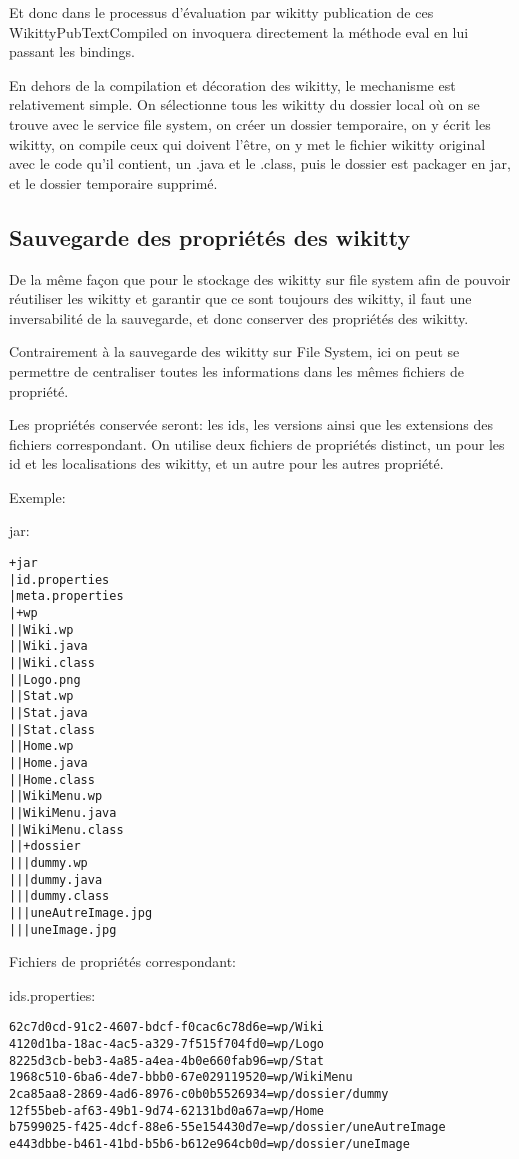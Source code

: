 Et donc dans le processus d'évaluation par wikitty publication de ces 
WikittyPubTextCompiled on invoquera directement la méthode eval en lui passant
les bindings.

En dehors de la compilation et décoration des wikitty, le mechanisme est 
relativement simple. On sélectionne tous les wikitty du dossier local où on
se trouve avec le service file system, on créer un dossier temporaire, 
on y écrit les wikitty, on compile ceux qui doivent l'être, on y met le fichier
wikitty original avec le code qu'il contient, un .java et le .class, puis le 
dossier est packager en jar, et le dossier temporaire supprimé.


\subsection{Sauvegarde des propriétés des wikitty}

De la même façon que pour le stockage des wikitty sur file system afin de 
pouvoir réutiliser les wikitty et garantir que ce sont toujours des wikitty,
il faut une inversabilité de la sauvegarde, et donc conserver des propriétés des
wikitty.

Contrairement à la sauvegarde des wikitty sur File System, ici on peut se 
permettre de centraliser toutes les informations dans les mêmes fichiers de 
propriété. 

Les propriétés conservée seront: les ids, les versions ainsi que les extensions
des fichiers correspondant. On utilise deux fichiers de propriétés distinct, 
un pour les id et les localisations des wikitty, et un autre pour les autres 
propriété.

Exemple: %

jar:
\begin{verbatim}
+jar
|id.properties
|meta.properties
|+wp
||Wiki.wp
||Wiki.java
||Wiki.class
||Logo.png
||Stat.wp
||Stat.java
||Stat.class
||Home.wp
||Home.java
||Home.class
||WikiMenu.wp
||WikiMenu.java
||WikiMenu.class
||+dossier
|||dummy.wp
|||dummy.java
|||dummy.class
|||uneAutreImage.jpg
|||uneImage.jpg
\end{verbatim}

Fichiers de propriétés correspondant:


ids.properties:
\begin{verbatim}
62c7d0cd-91c2-4607-bdcf-f0cac6c78d6e=wp/Wiki
4120d1ba-18ac-4ac5-a329-7f515f704fd0=wp/Logo
8225d3cb-beb3-4a85-a4ea-4b0e660fab96=wp/Stat
1968c510-6ba6-4de7-bbb0-67e029119520=wp/WikiMenu
2ca85aa8-2869-4ad6-8976-c0b0b5526934=wp/dossier/dummy
12f55beb-af63-49b1-9d74-62131bd0a67a=wp/Home
b7599025-f425-4dcf-88e6-55e154430d7e=wp/dossier/uneAutreImage
e443dbbe-b461-41bd-b5b6-b612e964cb0d=wp/dossier/uneImage
\end{verbatim}


